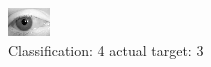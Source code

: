 \begin{figure}[h!]
\begin{center}
\includegraphics[width=0.60\columnwidth]{figures/ID2797_class_4_target_3.png}
\end{center}
\caption{ Classification: 4 actual target: 3}
\label{fig:ID2797_class_4_target_3}
\end{figure}
